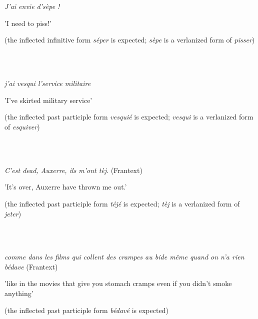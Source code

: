 \documentclass[output=paper]{langscibook}
\begin{document}
\ea%
    \label{ex:key:5}
    \gll \\
         \\
    \glt
    \z %

          \textit{J'ai envie d'sèpe !} \citep{Tengour2024}

  {}'I need to piss!'

  (the inflected infinitive form \textit{séper} is expected; \textit{sèpe} is a   verlanized form of \textit{pisser})

\ea%
    \label{ex:key:6}
    \gll \\
         \\
    \glt
    \z %

          \textit{j'ai vesqui l'service militaire} \citep{Tengour2024}

  {}'I've skirted military service'

  (the inflected past participle form \textit{vesquié} is expected; \textit{vesqui} is   a verlanized form of \textit{esquiver})

\ea%
    \label{ex:key:7}
    \gll \\
         \\
    \glt
    \z %

          \textit{C'est dead, Auxerre, ils m'ont tèj}. (Frantext)

  {}'It's over, Auxerre have thrown me out.'

  (the inflected past participle form \textit{téjé} is expected; \textit{tèj} is a   verlanized form of \textit{jeter})

\ea%
    \label{ex:key:8}
    \gll \\
         \\
    \glt
    \z %

          \textit{comme dans les films qui collent des crampes au bide même   quand on n'a rien bédave} (Frantext)

  {}'like in the movies that give you stomach cramps even if you   didn't smoke anything'

  (the inflected past participle form \textit{bédavé} is expected)

\ea%
    \label{ex:key:9}
    \gll \\
         \\
    \glt
    \z %
\end{document}
